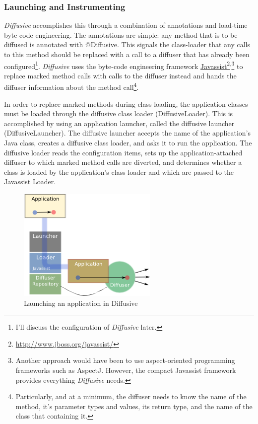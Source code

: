 \documentclass[11pt]{scrartcl}
\begin{document}
\subsubsection{Launching and Instrumenting\label{sec:launching_and_instrumenting}}
\emph{Diffusive} accomplishes this through a combination of annotations and load-time byte-code engineering. The annotations are simple: any method that is to be diffused is annotated with \textsf{@Diffusive}. This signals the class-loader that any calls to this method should be replaced with a call to a diffuser that has already been configured\footnote{I'll discuss the configuration of \emph{Diffusive} later.}. \emph{Diffusive} uses the byte-code engineering framework \href{http://www.jboss.org/javassist/}{Javassist}\footnote{\url{http://www.jboss.org/javassist/}}\textsuperscript{,}\footnote{Another approach would have been to use aspect-oriented programming frameworks such as AspectJ. However, the compact Javassist framework provides everything \emph{Diffusive} needs.} to replace marked method calls with calls to the diffuser instead and hands the diffuser information about the method call\footnote{Particularly, and at a minimum, the diffuser needs to know the name of the method, it's parameter types and values, its return type, and the name of the class that containing it.}.

In order to replace marked methods during class-loading, the application classes must be loaded through the diffusive class loader (\textsf{DiffusiveLoader}). This is accomplished by using an application launcher, called the diffusive launcher (\textsf{DiffusiveLauncher}). The diffusive launcher accepts the name of the application's Java class, creates a diffusive class loader, and asks it to run the application. The diffusive loader reads the configuration items, sets up the application-attached diffuser to which marked method calls are diverted, and determines whether a class is loaded by the application's class loader and which are passed to the Javassist \textsf{Loader}.

\begin{figure}[htbp]
\begin{center}
\includegraphics{diffusive_launcher}
\caption{Launching an application in Diffusive}
\label{fig:diffusive_launch_application}
\end{center}
\end{figure}
\end{document}
